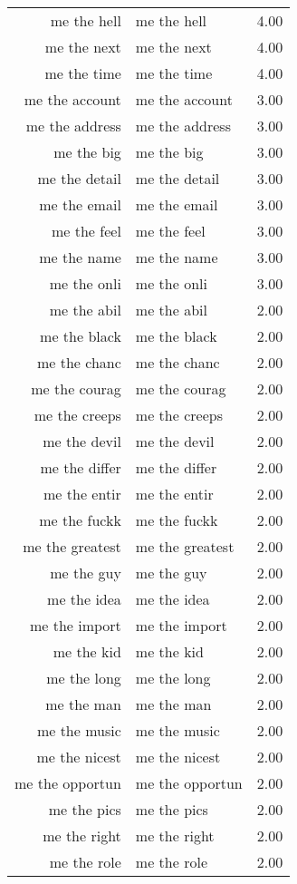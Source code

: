 \begin{table}[ht]
\begin{tabular}{rlr}
  me the hell & me the hell & 4.00 \\ 
  me the next & me the next & 4.00 \\ 
  me the time & me the time & 4.00 \\ 
  me the account & me the account & 3.00 \\ 
  me the address & me the address & 3.00 \\ 
  me the big & me the big & 3.00 \\ 
  me the detail & me the detail & 3.00 \\ 
  me the email & me the email & 3.00 \\ 
  me the feel & me the feel & 3.00 \\ 
  me the name & me the name & 3.00 \\ 
  me the onli & me the onli & 3.00 \\ 
  me the abil & me the abil & 2.00 \\ 
  me the black & me the black & 2.00 \\ 
  me the chanc & me the chanc & 2.00 \\ 
  me the courag & me the courag & 2.00 \\ 
  me the creeps & me the creeps & 2.00 \\ 
  me the devil & me the devil & 2.00 \\ 
  me the differ & me the differ & 2.00 \\ 
  me the entir & me the entir & 2.00 \\ 
  me the fuckk & me the fuckk & 2.00 \\ 
  me the greatest & me the greatest & 2.00 \\ 
  me the guy & me the guy & 2.00 \\ 
  me the idea & me the idea & 2.00 \\ 
  me the import & me the import & 2.00 \\ 
  me the kid & me the kid & 2.00 \\ 
  me the long & me the long & 2.00 \\ 
  me the man & me the man & 2.00 \\ 
  me the music & me the music & 2.00 \\ 
  me the nicest & me the nicest & 2.00 \\ 
  me the opportun & me the opportun & 2.00 \\ 
  me the pics & me the pics & 2.00 \\ 
  me the right & me the right & 2.00 \\ 
  me the role & me the role & 2.00 \\ 

\end{tabular}
\end{table}

